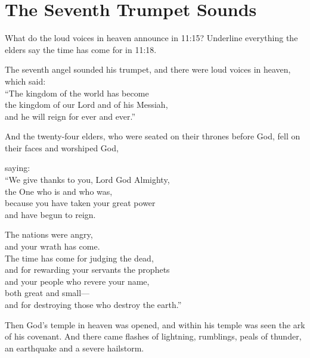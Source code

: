 \section{The Seventh Trumpet Sounds}

\begin{ScriptureBox2}{What do the loud voices in heaven announce in 11:15? Underline everything the elders say the time has come for in 11:18.}

\item[11:15] The seventh angel sounded his trumpet, and there were loud voices in heaven, which said:\\
\hspace*{1em}``The kingdom of the world has become\\
\hspace*{2em}the kingdom of our Lord and of his Messiah,\\
\hspace*{2em}and he will reign for ever and ever.''

\item[11:16] And the twenty-four elders, who were seated on their thrones before God, fell on their faces and worshiped God,

\item[11:17] saying:\\
\hspace*{1em}``We give thanks to you, Lord God Almighty,\\
\hspace*{2em}the One who is and who was,\\
\hspace*{1em}because you have taken your great power\\
\hspace*{2em}and have begun to reign.

\item[11:18] \hspace*{1em}The nations were angry,\\
\hspace*{2em}and your wrath has come.\\
\hspace*{1em}The time has come for judging the dead,\\
\hspace*{2em}and for rewarding your servants the prophets\\
\hspace*{1em}and your people who revere your name,\\
\hspace*{2em}both great and small---\\
\hspace*{1em}and for destroying those who destroy the earth.''

\item[11:19] Then God's temple in heaven was opened, and within his temple was seen the ark of his covenant. And there came flashes of lightning, rumblings, peals of thunder, an earthquake and a severe hailstorm.

\end{ScriptureBox2}

